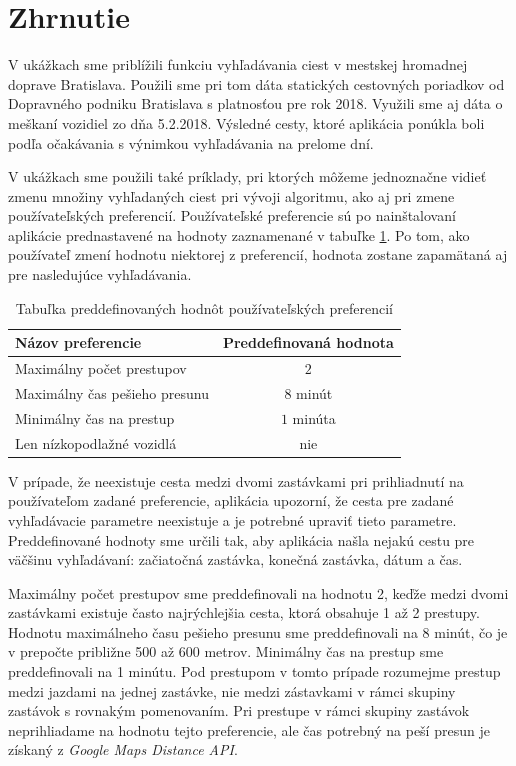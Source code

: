 \section{Zhrnutie}
V ukážkach sme priblížili funkciu vyhľadávania ciest v mestskej hromadnej doprave Bratislava. Použili sme pri tom dáta statických cestovných poriadkov od Dopravného podniku Bratislava s platnosťou pre rok 2018. Využili sme aj dáta o meškaní vozidiel zo dňa 5.2.2018. Výsledné cesty, ktoré aplikácia ponúkla boli podľa očakávania s výnimkou vyhľadávania na prelome dní. 

V ukážkach sme použili také príklady, pri ktorých môžeme jednoznačne vidieť zmenu množiny vyhľadaných ciest pri vývoji algoritmu, ako aj pri zmene používateľských preferencií. Používateľské preferencie sú po nainštalovaní aplikácie prednastavené na hodnoty zaznamenané v tabuľke \ref{table:default-preferencies}. Po tom, ako používateľ zmení hodnotu niektorej z preferencií, hodnota zostane zapamätaná aj pre nasledujúce vyhľadávania. 

\begin{table}[H]
\small
\begin{center}
\begin{tabular}{|l|c|}
\hline
\rowcolor[HTML]{C0C0C0} 
\textbf{Názov preferencie} & \textbf{Preddefinovaná hodnota} \\ \hline
Maximálny počet prestupov  & $2$         \\ \hline
Maximálny čas pešieho presunu & $8$  minút  \\ \hline
Minimálny čas na prestup & $1$ minúta  \\ \hline
Len nízkopodlažné vozidlá & nie  \\ \hline
\end{tabular}
\end{center}
\caption{Tabuľka preddefinovaných hodnôt používateľských preferencií}
\label{table:default-preferencies}
\end{table}

V prípade, že neexistuje cesta medzi dvomi zastávkami pri prihliadnutí na používateľom zadané preferencie, aplikácia upozorní, že cesta pre zadané vyhľadávacie parametre neexistuje a je potrebné upraviť tieto parametre. Preddefinované hodnoty sme určili tak, aby aplikácia našla nejakú cestu pre väčšinu vyhľadávaní: začiatočná zastávka, konečná zastávka, dátum a čas. 

Maximálny počet prestupov sme preddefinovali na hodnotu 2, keďže medzi dvomi zastávkami existuje často najrýchlejšia cesta, ktorá obsahuje 1 až 2 prestupy. Hodnotu maximálneho času pešieho presunu sme preddefinovali na 8 minút, čo je v prepočte približne 500 až 600 metrov. Minimálny čas na prestup sme preddefinovali na 1 minútu. Pod prestupom v tomto prípade rozumejme prestup medzi jazdami na jednej zastávke, nie medzi zástavkami v rámci skupiny zastávok s rovnakým pomenovaním. Pri prestupe v rámci skupiny zastávok neprihliadame na hodnotu tejto preferencie, ale čas potrebný na peší presun je získaný z \textit{Google Maps Distance API}. 

